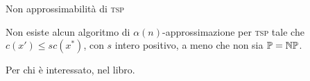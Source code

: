 \begin{frame}{Non approssimabilità di \textsc{tsp}}

\vspace{-9pt}
\begin{myboxtitle}[Teorema]
Non esiste alcun algoritmo di $\alpha(n)$-approssimazione per 
\textsc{tsp} tale che $c(x') \le sc(x^*)$, con $s$ intero positivo, a meno che non sia $\mathbb{P} = \mbox{$\mathbb{NP}$}$.
\end{myboxtitle}

\begin{myboxtitle}[Dimostrazione]
Per chi è interessato, nel libro.
\end{myboxtitle}
\end{frame}

%
%
%

